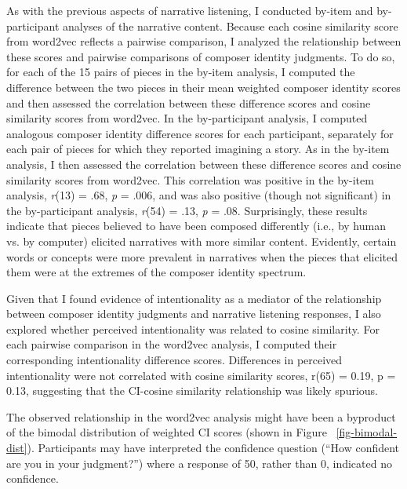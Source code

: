 \documentclass[12pt,twoside]{reedthesis}
\begin{document}
As with the previous aspects of narrative listening, I conducted by-item and by-participant analyses of the narrative content. Because each cosine similarity score from word2vec reflects a pairwise comparison, I analyzed the relationship between these scores and pairwise comparisons of composer identity judgments. To do so, for each of the 15 pairs of pieces in the by-item analysis, I computed the difference between the two pieces in their mean weighted composer identity scores and then assessed the correlation between these difference scores and cosine similarity scores from word2vec. In the by-participant analysis, I computed analogous composer identity difference scores for each participant, separately for each pair of pieces for which they reported imagining a story. As in the by-item analysis, I then assessed the correlation between these difference scores and cosine similarity scores from word2vec. This correlation was positive in the by-item analysis, \emph{r}(13) = .68, \emph{p} = .006, and was also positive (though not significant) in the by-participant analysis, \emph{r}(54) = .13, \emph{p} = .08. Surprisingly, these results indicate that pieces believed to have been composed differently (i.e., by human vs. by computer) elicited narratives with more similar content. Evidently, certain words or concepts were more prevalent in narratives when the pieces that elicited them were at the extremes of the composer identity spectrum. 

Given that I found evidence of intentionality as a mediator of the relationship between composer identity judgments and narrative listening responses, I also explored whether perceived intentionality was related to cosine similarity. For each pairwise comparison in the word2vec analysis, I computed their corresponding intentionality difference scores. Differences in perceived intentionality were not correlated with cosine similarity scores, r(65) = 0.19, p = 0.13, suggesting that the CI-cosine similarity relationship was likely spurious.

The observed relationship in the word2vec analysis might have been a byproduct of the bimodal distribution of weighted CI scores (shown in Figure ~\ref*{fig-bimodal-dist}). Participants may have interpreted the confidence question (“How confident are you in your judgment?”) where a response of 50, rather than 0, indicated no confidence.
\end{document}

